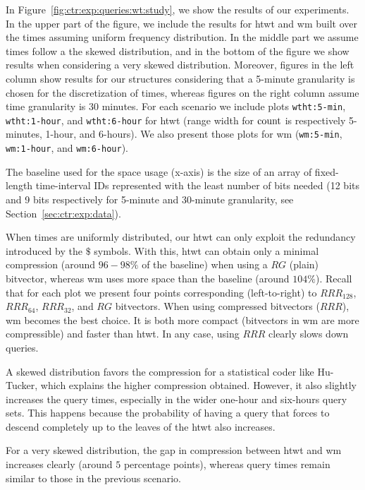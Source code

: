 	In Figure~\ref{fig:ctr:exp:queries:wt:study}, we show the results of our experiments. In the upper part of the figure, we 
	include the results for \gls{htwt} and \gls{wm} built over the times assuming uniform frequency distribution.
	In the middle part we assume times follow a the skewed distribution, and in the bottom of the figure we show
	results when considering a very skewed distribution. Moreover, figures in the left column show results
	for our structures considering that a 5-minute granularity is chosen for the discretization of times, whereas
	figures on the right column assume time granularity is 30 minutes. For each scenario we include plots
	\texttt{wtht:5-min}, \texttt{wtht:1-hour}, and \texttt{wtht:6-hour} for \gls{htwt} (range width for $\operatorname{count}$ is respectively
	5-minutes, 1-hour, and 6-hours). We also present those plots for \gls{wm} (\texttt{wm:5-min}, \texttt{wm:1-hour}, and \texttt{wm:6-hour}).

	The baseline used for the space usage (x-axis) is the size of an array of
	fixed-length time-interval IDs represented with the least number of bits needed (12 bits and 9 bits
	respectively for 5-minute and 30-minute granularity, see Section~\ref{sec:ctr:exp:data}).
	\medskip

	When times are uniformly distributed, our \gls{htwt} can only exploit the redundancy introduced by
	the $\$$ symbols. With this, \gls{htwt} can obtain only a minimal compression (around $96-98\%$ of the baseline)
	when using a $RG$ (plain) bitvector, whereas \gls{wm} uses more space than the baseline (around $104\%$).
	Recall that for each plot we present four points corresponding (left-to-right) 
	to $RRR_{128}$, $RRR_{64}$, $RRR_{32}$, and $RG$ bitvectors.
	When using compressed  bitvectors ($RRR$), \gls{wm} becomes the best choice. It is both more compact 
	(bitvectors in \gls{wm} are more compressible) and faster than \gls{htwt}. 
	In any case, using $RRR$ clearly slows down queries.

	A skewed distribution favors the compression for a statistical coder like Hu-Tucker,
	which explains the higher compression obtained. However,
	it also slightly increases the query times, especially in the wider
	one-hour and six-hours query sets. This happens because the probability of having a query 
	that forces to descend completely up to the leaves of the \gls{htwt} also increases.

	For a very skewed distribution, the gap in compression between \gls{htwt} and \gls{wm} increases clearly (around 
	$5$ percentage points), whereas query times remain similar to those in the previous scenario.

